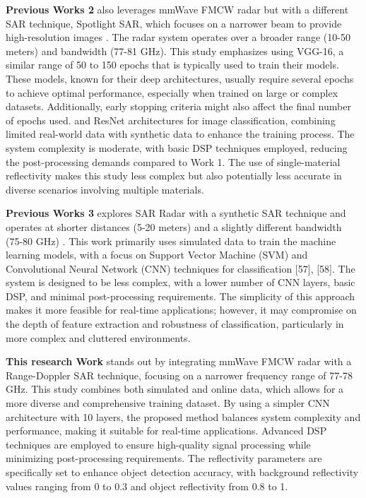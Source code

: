 \documentclass[journal,article,submit,pdftex,moreauthors]{Definitions/mdpi}
\begin{document}
\textbf{Previous Works 2} also leverages mmWave FMCW radar but with a different SAR technique, Spotlight SAR, which focuses on a narrower beam to provide high-resolution images \cite{gao2020synthetic,zheng2019robust,chen2021image,lee2020radar,li2022deep,huang2022millimeter}. The radar system operates over a broader range (10-50 meters) and bandwidth (77-81 GHz). This study emphasizes using VGG-16, a similar range of 50 to 150 epochs that is typically used to train their models. These models, known for their deep architectures, usually require several epochs to achieve optimal performance, especially when trained on large or complex datasets. Additionally, early stopping criteria might also affect the final number of epochs used. and ResNet architectures for image classification, combining limited real-world data with synthetic data to enhance the training process. The system complexity is moderate, with basic DSP techniques employed, reducing the post-processing demands compared to Work 1. The use of single-material reflectivity makes this study less complex but also potentially less accurate in diverse scenarios involving multiple materials.

\textbf{Previous Works 3} explores SAR Radar with a synthetic SAR technique and operates at shorter distances (5-20 meters) and a slightly different bandwidth (75-80 GHz) \cite{sun2019machine,wang2018sar,li2017target,wu2023fmcw,26,kang2021real,chen2023real}. This work primarily uses simulated data to train the machine learning models, with a focus on Support Vector Machine (SVM) and Convolutional Neural Network (CNN) techniques for classification [57], [58]. The system is designed to be less complex, with a lower number of CNN layers, basic DSP, and minimal post-processing requirements. The simplicity of this approach makes it more feasible for real-time applications; however, it may compromise on the depth of feature extraction and robustness of classification, particularly in more complex and cluttered environments.

\textbf{This research Work} stands out by integrating mmWave FMCW radar with a Range-Doppler SAR technique, focusing on a narrower frequency range of 77-78 GHz. This study combines both simulated and online data, which allows for a more diverse and comprehensive training dataset. By using a simpler CNN architecture with 10 layers, the proposed method balances system complexity and performance, making it suitable for real-time applications. Advanced DSP techniques are employed to ensure high-quality signal processing while minimizing post-processing requirements. The reflectivity parameters are specifically set to enhance object detection accuracy, with background reflectivity values ranging from 0 to 0.3 and object reflectivity from 0.8 to 1.
\end{document}
